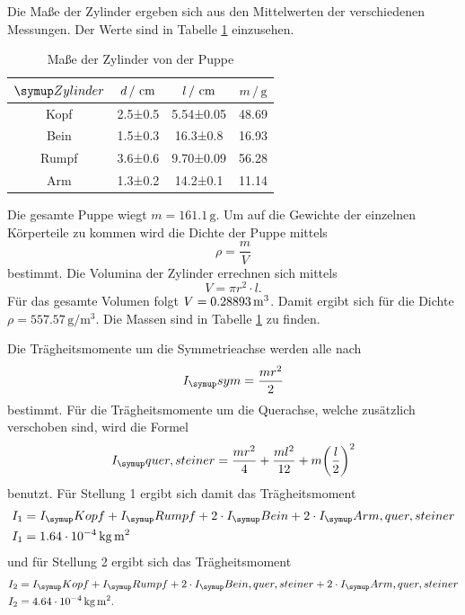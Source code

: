 Die Maße der Zylinder ergeben sich aus den Mittelwerten der verschiedenen Messungen.
Der Werte sind in Tabelle \ref{tab:wertepuppe} einzusehen.
\begin{table}
  \centering
  \begin{tabular}{c c c c}
    \toprule
    $\su{Zylinder}$ & $d \,/\,\,\si{\centi\meter}$ & $l\,/\,\,\si{\centi\meter}$ & $ m\,/\,\si{\gram}$ \\
    \midrule
    Kopf & 2.5±0.5 & 5.54±0.05 & 48.69 \\
    Bein & 1.5±0.3 & 16.3±0.8 & 16.93 \\
    Rumpf & 3.6±0.6 & 9.70±0.09 & 56.28 \\
    Arm & 1.3±0.2 & 14.2±0.1 & 11.14 \\
    \bottomrule
  \end{tabular}
  \caption{Maße der Zylinder von der Puppe}
  \label{tab:wertepuppe}
\end{table}
Die gesamte Puppe wiegt $m = 161.1\,\si{\gram}$. Um auf die Gewichte der einzelnen
Körperteile zu kommen wird die Dichte der Puppe mittels
\begin{equation}
  \rho = \frac{m}{V}
\end{equation}
bestimmt. Die Volumina der Zylinder errechnen sich mittels
\begin{equation}
  V = \pi r^2 \cdot l.
\end{equation}
Für das gesamte Volumen folgt $V = 0.28893 \,\si{\cubic\meter}$. Damit ergibt sich für die
Dichte $ \rho = 557.57 \,\si{\gram\per\cubic\meter}$. Die Massen sind
in Tabelle \ref{tab:wertepuppe} zu finden.

Die Trägheitsmomente um die Symmetrieachse werden alle nach
\begin{equation}
  I_\su{sym} = \frac{mr^2}{2}
\end{equation}
bestimmt.
Für die Trägheitsmomente um die Querachse, welche zusätzlich verschoben sind,
wird die Formel
\begin{equation}
  I_\su{quer,steiner} = \frac{mr^2}{4} + \frac{ml^2}{12} + m \biggl(\frac{l}{2}\biggr)^2
\end{equation}
benutzt.
Für Stellung 1 ergibt sich damit das Trägheitsmoment
\begin{align}
  I_1 &= I_\su{Kopf} + I_\su{Rumpf} + 2 \cdot I_\su{Bein} + 2 \cdot I_\su{Arm,quer,steiner} \\
  I_1 &= 1.64 \cdot 10^{-4} \,\si{\kilo\gram\square\meter}
\end{align}
und für Stellung 2 ergibt sich das Trägheitsmoment
\begin{align}
  I_2 &= I_\su{Kopf} + I_\su{Rumpf} + 2 \cdot I_\su{Bein,quer,steiner} + 2 \cdot I_\su{Arm,quer,steiner} \\
  I_2 &= 4.64 \cdot 10^{-4} \,\si{\kilo\gram\square\meter}.
\end{align}
